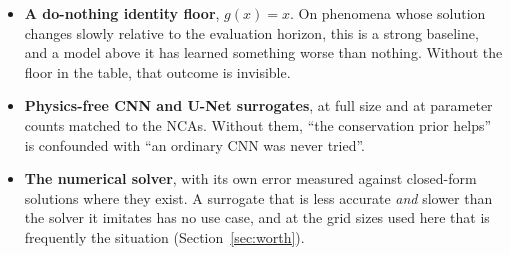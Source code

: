 \documentclass{article}
\begin{document}
\begin{itemize}
\item \textbf{A do-nothing identity floor}, $g(x)=x$. On phenomena whose solution changes
  slowly relative to the evaluation horizon, this is a strong baseline, and a model above
  it has learned something worse than nothing. Without the floor in the table, that
  outcome is invisible.
\item \textbf{Physics-free CNN and U-Net surrogates}, at full size and at parameter counts
  matched to the NCAs. Without them, ``the conservation prior helps'' is confounded with
  ``an ordinary CNN was never tried''.
\item \textbf{The numerical solver}, with its own error measured against closed-form
  solutions where they exist. A surrogate that is less accurate \emph{and} slower than the
  solver it imitates has no use case, and at the grid sizes used here that is frequently
  the situation (Section~\ref{sec:worth}).
\end{itemize}
\end{document}
